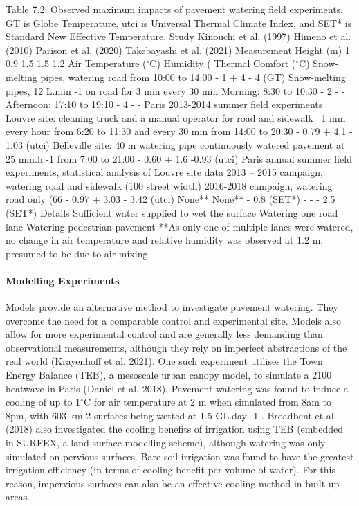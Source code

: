 \documentclass[final,3p,times,authoryear]{elsarticle}
\begin{document}
Table 7.2: Observed maximum impacts of pavement watering field experiments. GT is Globe Temperature, \gls{utci} is Universal Thermal Climate Index, and SET* is Standard
New Effective Temperature.
Study
Kinouchi et al.
(1997)
Himeno et al.
(2010)
\cite{Hendel2016}
Parison et al.
(2020)
Takebayashi et
al. (2021)
Measurement
Height (m)
1
0.9
1.5
1.5
1.2
Air
Temperature
($^{\circ}$C) Humidity
(%
Thermal Comfort
($^{\circ}$C)
Snow-melting pipes, watering road from 10:00 to 14:00 - 1 + 4 - 4 (GT)
Snow-melting pipes, 12 L.min -1 on road for 3 min every 30 min
Morning: 8:30 to 10:30 - 2 - -
Afternoon: 17:10 to 19:10 - 4 - -
Paris 2013-2014 summer field experiments
Louvre site: cleaning truck and a manual operator for road and
sidewalk ~1 mm every hour from 6:20 to 11:30 and every 30
min from 14:00 to 20:30 - 0.79 + 4.1 - 1.03 (\gls{utci})
Belleville site: 40 m watering pipe continuously watered
pavement at 25 mm.h -1 from 7:00 to 21:00 - 0.60 + 1.6 -0.93 (\gls{utci})
Paris annual summer field experiments, statistical analysis of
Louvre site data
2013 – 2015 campaign, watering road and sidewalk (100%
street width)
2016-2018 campaign, watering road only (66%
- 0.97 + 3.03 - 3.42 (\gls{utci})
None** None** - 0.8 (SET*)
- - - 2.5 (SET*)
Details
Sufficient water supplied to wet the surface
Watering one road lane
Watering pedestrian pavement
**As only one of multiple lanes were watered, no change in air temperature and relative humidity was observed at 1.2 m, presumed to be due to air mixing
\label{table:7.2}


\paragraph{Modelling Experiments}\label{sec:appendix7.1.4}

Models provide an alternative method to investigate pavement watering. They
overcome the need for a comparable control and experimental site. Models also allow
for more experimental control and are generally less demanding than observational measurements, although they rely on imperfect abstractions of the real world
(Krayenhoff et al. 2021).
One such experiment utilises the Town Energy Balance (TEB), a mesoscale urban
canopy model, to simulate a 2100 heatwave in Paris (Daniel et al. 2018). Pavement
watering was found to induce a cooling of up to 1$^{\circ}$C for air temperature at 2 m when
simulated from 8am to 8pm, with 603 km 2 surfaces being wetted at 1.5 GL.day -1 .
Broadbent et al. (2018) also investigated the cooling benefits of irrigation using TEB
(embedded in SURFEX, a land surface modelling scheme), although watering was only
simulated on pervious surfaces. Bare soil irrigation was found to have the greatest
irrigation efficiency (in terms of cooling benefit per volume of water). For this reason,
impervious surfaces can also be an effective cooling method in built-up areas.
\end{document}
